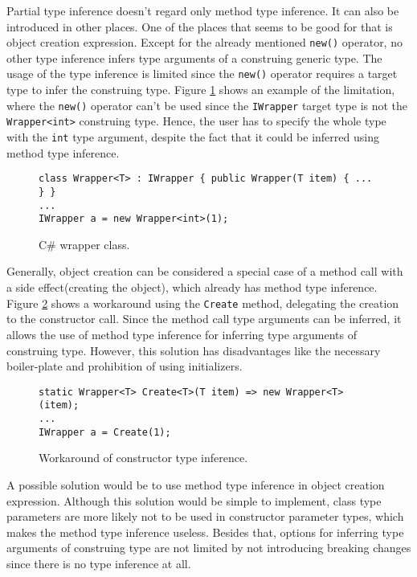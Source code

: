 Partial type inference doesn’t regard only method type inference. 
It can also be introduced in other places. One of the places that seems to be good for that is object creation expression. 
Except for the already mentioned \texttt{new()} operator, no other type inference infers type arguments of a construing generic type. The usage of the type inference is limited since the \texttt{new()} operator requires a target type to infer the construing type. 
Figure \ref{img34:wrapper} shows an example of the limitation, where the \texttt{new()} operator can’t be used since the \texttt{IWrapper} target type is not the \texttt{Wrapper<int>} construing type. 
Hence, the user has to specify the whole type with the \texttt{int} type argument, despite the fact that it could be inferred using method type inference.
\begin{figure}[h]
\begin{lstlisting}[style=csharp]
class Wrapper<T> : IWrapper { public Wrapper(T item) { ... } }
...
IWrapper a = new Wrapper<int>(1);
\end{lstlisting}
\caption{C\# wrapper class.}
\label{img34:wrapper}
\end{figure}
\par
Generally, object creation can be considered a special case of a method call with a side effect(creating the object), which already has method type inference. 
Figure \ref{img35:workaroung} shows a workaround using the \texttt{Create} method, delegating the creation to the constructor call. 
Since the method call type arguments can be inferred, it allows the use of method type inference for inferring type arguments of construing type. 
However, this solution has disadvantages like the necessary boiler-plate and prohibition of using initializers.
\begin{figure}[h]
\begin{lstlisting}[style=csharp]
static Wrapper<T> Create<T>(T item) => new Wrapper<T>(item);
...
IWrapper a = Create(1);
\end{lstlisting}
\caption{Workaround of constructor type inference.}
\label{img35:workaroung}
\end{figure}
\par
A possible solution would be to use method type inference in object creation expression. 
Although this solution would be simple to implement, class type parameters are more likely not to be used in constructor parameter types, which makes the method type inference useless. 
Besides that, options for inferring type arguments of construing type are not limited by not introducing breaking changes since there is no type inference at all. 

